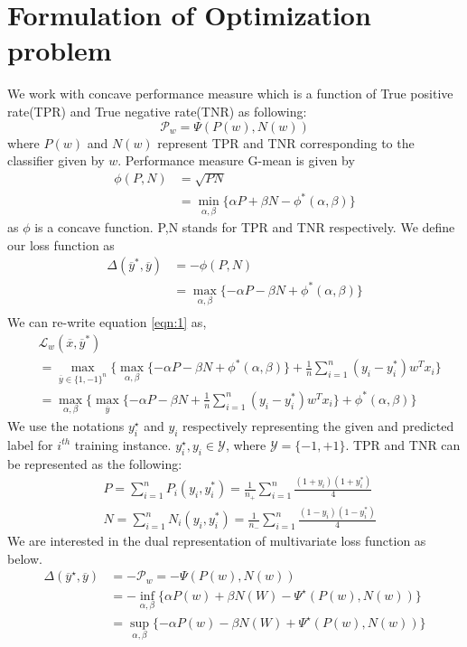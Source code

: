 \documentclass{article} %
\begin{document}
\section{Formulation of Optimization problem}
We work with concave performance measure which is a function of True positive rate(TPR) and True negative rate(TNR) as following:
$$
\mathcal{P}_w = \Psi(P(w),N(w))
$$
where $P(w)$ and $N(w)$ represent TPR and TNR corresponding to the classifier given by $w$. 
Performance measure G-mean is given by
\begin{align*}
\phi(P,N) &=\sqrt{PN}\\
& = \min_{\alpha,\beta}\{\alpha P+\beta N - \phi^*(\alpha,\beta)\}
\end{align*}
as $\phi$ is a concave function. P,N stands for TPR and TNR respectively. We define our loss function as
\begin{align*}
\Delta(\overline{y}^*,\overline{y}) &= -\phi(P,N) \\
&= \max_{\alpha,\beta}\{-\alpha P-\beta N + \phi^*(\alpha,\beta)\}\\
\end{align*}
We can re-write equation \ref{eqn:1} as,
\begin{align}
\label{eqn:2}
&\mathcal L_w(\overline{x},\overline{y}^*)\nonumber\\
&=\max_{\overline{y}\in\{1,-1\}^n}\{\max_{\alpha,\beta}\{-\alpha P-\beta N +\phi^*(\alpha,\beta)\} + \frac{1}{n}\sum_{i=1}^n (y_i - y_i^*)w^Tx_i\}\nonumber\\
&=\max_{\alpha,\beta}\{\max_{\overline{y}}\{-\alpha P-\beta N  + \frac{1}{n}\sum_{i=1}^n (y_i - y_i^*)w^Tx_i\}+\phi^*(\alpha,\beta)\}
\end{align}
We use the notations $y_i^{\star}$ and $y_i$ respectively representing the given and predicted label for $i^{th}$ training instance. $y_i^{\star},y_i\in\mathcal{Y}$, where $\mathcal{Y}=\{-1,+1\}$. TPR and TNR can be represented as the following:
\begin{align*}
&P = \sum_{i=1}^nP_i(y_i,y_i^*)= \frac{1}{n_+}\sum_{i=1}^n\frac{(1+y_i)(1+y_i^*)}{4}\\
&N = \sum_{i=1}^nN_i(y_i,y_i^*)= \frac{1}{n_-}\sum_{i=1}^n\frac{(1-y_i)(1-y_i^*)}{4}
\end{align*}
We are interested in the dual representation of multivariate loss function as below. 
\begin{equation}
\begin{split}
\Delta(\overline{y}^\star,\overline{y}) & = -\mathcal{P}_w = -\Psi(P(w),N(w))\\
& = -\inf_{\alpha,\beta}\{\alpha P(w)+\beta N(W)-\Psi^\star(P(w),N(w))\}\\
& = \sup_{\alpha,\beta}\{-\alpha P(w)-\beta N(W)+\Psi^\star(P(w),N(w))\}
\end{split}
\end{equation}
\end{document}
